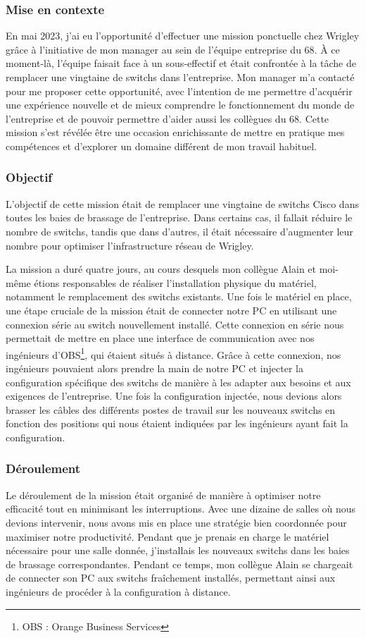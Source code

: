 \documentclass[12pt, a4paper]{article}
\begin{document}
\subsubsection{Mise en contexte}
En mai 2023, j'ai eu l'opportunité d'effectuer une mission
ponctuelle chez Wrigley grâce à l'initiative de mon manager au
sein de l'équipe entreprise du 68. À ce moment-là, l'équipe faisait
face à un sous-effectif et était confrontée à la tâche de remplacer
une vingtaine de switchs dans l'entreprise. Mon manager m'a
contacté pour me proposer cette opportunité, avec l'intention de
me permettre d'acquérir une expérience nouvelle et de mieux
comprendre le fonctionnement du monde de l'entreprise et 
de pouvoir permettre d'aider aussi les collègues du 68. Cette mission
s'est révélée être une occasion enrichissante de mettre en pratique
mes compétences et d'explorer un domaine différent de mon travail habituel.

\subsubsection{Objectif}
L'objectif de cette mission était
de remplacer une vingtaine de switchs
Cisco dans toutes les baies de brassage de l'entreprise.
Dans certains cas, il fallait
réduire le nombre de switchs, tandis que dans d'autres, il
était nécessaire d'augmenter leur nombre pour optimiser
l'infrastructure réseau de Wrigley.

La mission a duré quatre jours, au cours desquels 
mon collègue Alain et moi-même étions responsables 
de réaliser l'installation physique
du matériel, notamment le remplacement des switchs existants.
Une fois le matériel en place, une étape cruciale de la mission
était de connecter notre PC en utilisant une connexion série au
switch nouvellement installé. Cette connexion en série nous
permettait de mettre en place une interface de communication
avec nos ingénieurs d'OBS\footnote{OBS : Orange Business Services},
qui étaient situés à distance.
Grâce à cette connexion, nos ingénieurs pouvaient alors prendre
la main de notre PC et injecter
la configuration spécifique des switchs de manière à les adapter
aux besoins et aux exigences de l'entreprise.
Une fois la configuration injectée, nous devions alors brasser 
les câbles des différents postes de travail sur les nouveaux switchs
en fonction des positions qui nous étaient indiquées par les
ingénieurs ayant fait la configuration.

\subsubsection{Déroulement}
Le déroulement de la mission était organisé de manière à optimiser
notre efficacité tout en minimisant les interruptions. Avec une
dizaine de salles où nous devions intervenir, nous avons mis en place une stratégie
bien coordonnée pour maximiser notre productivité. Pendant que je
prenais en charge le matériel nécessaire pour une salle donnée,
j'installais les nouveaux switchs dans les baies de brassage
correspondantes. Pendant ce temps, mon collègue Alain se chargeait
de connecter son PC aux switchs fraîchement installés, permettant
ainsi aux ingénieurs de procéder à la configuration à distance.
\end{document}
